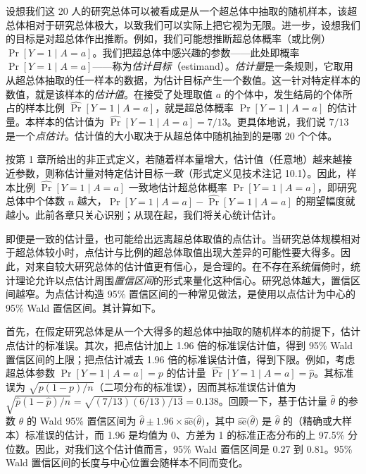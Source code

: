 设想我们这 20 人的研究总体可以被看成是从一个超总体中抽取的随机样本，该超总体相对于研究总体极大，以致我们可以实际上把它视为无限。进一步，设想我们的目标是对超总体作出推断。例如，我们可能想推断超总体概率（或比例）$\Pr[Y=1\mid A=a]$。我们把超总体中感兴趣的参数——此处即概率 $\Pr[Y=1\mid A=a]$——称为\emph{估计目标}（estimand）。\emph{估计量}是一条规则，它取用从超总体抽取的任一样本的数据，为估计目标产生一个数值。这一针对特定样本的数值，就是该样本的\emph{估计值}。在接受了处理取值 $a$ 的个体中，发生结局的个体所占的样本比例 $\widehat{\Pr}[Y=1\mid A=a]$，就是超总体概率 $\Pr[Y=1\mid A=a]$ 的估计量。本样本的估计值为 $\widehat{\Pr}[Y=1\mid A=a]=7/13$。更具体地说，我们说 $7/13$ 是一个\emph{点估计}。估计值的大小取决于从超总体中随机抽到的是哪 20 个个体。

按第 1 章所给出的非正式定义，若随着样本量增大，估计值（任意地）越来越接近参数，则称估计量对特定估计目标\emph{一致}（形式定义见技术注记 10.1）。因此，样本比例 $\widehat{\Pr}[Y=1\mid A=a]$ 一致地估计超总体概率 $\Pr[Y=1\mid A=a]$，即研究总体中个体数 $n$ 越大，$\Pr[Y=1\mid A=a]-\widehat{\Pr}[Y=1\mid A=a]$ 的期望幅度就越小。此前各章只关心识别；从现在起，我们将关心统计估计。

即便是一致的估计量，也可能给出远离超总体取值的点估计。当研究总体规模相对于超总体较小时，点估计与比例的超总体取值出现大差异的可能性要大得多。因此，对来自较大研究总体的估计值更有信心，是合理的。在不存在系统偏倚时，统计理论允许以点估计周围\emph{置信区间}的形式来量化这种信心。研究总体越大，置信区间越窄。为点估计构造 95\% 置信区间的一种常见做法，是使用以点估计为中心的 95\% Wald 置信区间。其计算如下。

首先，在假定研究总体是从一个大得多的超总体中抽取的随机样本的前提下，估计点估计的标准误。其次，把点估计加上 1.96 倍的标准误估计值，得到 95\% Wald 置信区间的上限；把点估计减去 1.96 倍的标准误估计值，得到下限。例如，考虑超总体参数 $\Pr[Y=1\mid A=a]=p$ 的估计量 $\widehat{\Pr}[Y=1\mid A=a]=\hat p$。其标准误为 $\sqrt{p(1-p)/n}$（二项分布的标准误），因而其标准误估计值为 $\sqrt{\hat p(1-\hat p)/n}=\sqrt{(7/13)(6/13)/13}=0.138$。回顾一下，基于估计量 $\hat\theta$ 的参数 $\theta$ 的 Wald 95\% 置信区间为 $\hat\theta\pm 1.96\times\widehat{\mathrm{se}}\bigl(\hat\theta\bigr)$，其中 $\widehat{\mathrm{se}}\bigl(\hat\theta\bigr)$ 是 $\hat\theta$ 的（精确或大样本）标准误的估计，而 1.96 是均值为 0、方差为 1 的标准正态分布的上 97.5\% 分位数。因此，对我们这个估计值而言，95\% Wald 置信区间是 0.27 到 0.81。95\% Wald 置信区间的长度与中心位置会随样本不同而变化。

